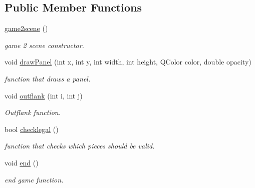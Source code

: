\subsection*{Public Member Functions}
\begin{DoxyCompactItemize}
\item 
\hyperlink{classgame2scene_aa3642161921dd08a8fa5c83e94c2ffe0}{game2scene} ()
\begin{DoxyCompactList}\small\item\em game 2 scene constructor. \end{DoxyCompactList}\item 
void \hyperlink{classgame2scene_a507687b5f74b925022c7a43749cf6607}{draw\+Panel} (int x, int y, int width, int height, Q\+Color color, double opacity)
\begin{DoxyCompactList}\small\item\em function that draws a panel. \end{DoxyCompactList}\item 
void \hyperlink{classgame2scene_a62c522d6732ff2a4889ba59ccc74f0dc}{outflank} (int i, int j)
\begin{DoxyCompactList}\small\item\em Outflank function. \end{DoxyCompactList}\item 
bool \hyperlink{classgame2scene_ae58d542526a191cf327675b83694f4ec}{checklegal} ()
\begin{DoxyCompactList}\small\item\em function that checks which pieces should be valid. \end{DoxyCompactList}\item 
void \hyperlink{classgame2scene_a6ce6a4eaa445f93d88e48d2bf06b0a13}{end} ()
\begin{DoxyCompactList}\small\item\em end game function. \end{DoxyCompactList}\end{DoxyCompactItemize}

